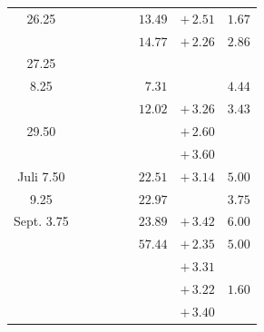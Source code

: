 \documentclass[12pt,a4paper]{article}
\begin{document}
\begin{center}
\begin{tabular}{c|c|c|c|c}
\phantom{0}\phantom{0} 26.25 & & $\phantom{0}\phantom{0}\phantom{0}\phantom{0}\phantom{0}\phantom{0}\phantom{0}13.49$ & $+\,2.51$ & $1.67$ \\
& & $\phantom{0}\phantom{0}\phantom{0}\phantom{0}\phantom{0}\phantom{0}\phantom{0}14.77$ & $+\,2.26$ & $2.86$ \\
\phantom{0}\phantom{0} 27.25 & & & & \\
\phantom{0}\phantom{0}\phantom{0} 8.25 & & $\phantom{0}\phantom{0}\phantom{0}\phantom{0}\phantom{0}\phantom{0}\phantom{0}\phantom{0}7.31$ & & $4.44$ \\
& & $\phantom{0}\phantom{0}\phantom{0}\phantom{0}\phantom{0}\phantom{0}\phantom{0}12.02$ & $+\,3.26$ & $3.43$ \\
\phantom{0}\phantom{0} 29.50 & & & $+\,2.60$ & \\
& & & $+\,3.60$ & \\
Juli \phantom{0}\phantom{0} 7.50 & & $\phantom{0}\phantom{0}\phantom{0}\phantom{0}\phantom{0}\phantom{0}\phantom{0}22.51$ & $+\,3.14$ & $5.00$ \\
\phantom{0}\phantom{0}\phantom{0} 9.25 & & $\phantom{0}\phantom{0}\phantom{0}\phantom{0}\phantom{0}\phantom{0}\phantom{0}22.97$ & & $3.75$ \\
Sept. \phantom{0} 3.75 & & $\phantom{0}\phantom{0}\phantom{0}\phantom{0}\phantom{0}\phantom{0}\phantom{0}23.89$ & $+\,3.42$ & $6.00$ \\
& & $\phantom{0}\phantom{0}\phantom{0}\phantom{0}\phantom{0}\phantom{0}\phantom{0}57.44$ & $+\,2.35$ & $5.00$ \\
& & & $+\,3.31$ & \\
& & & $+\,3.22$ & $1.60$ \\
& & & $+\,3.40$ & \\
\bottomrule
\end{tabular}
\end{center}
\end{document}
